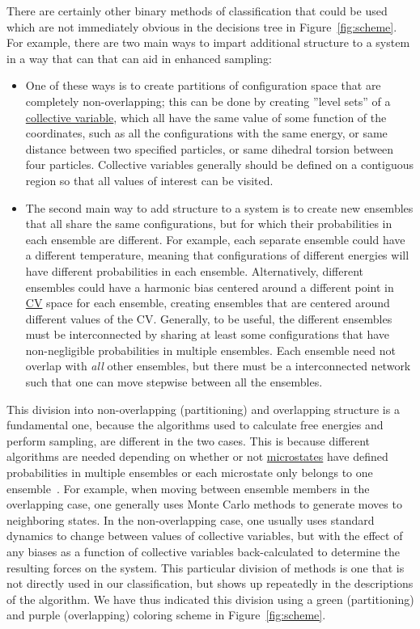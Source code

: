 \documentclass[9pt,review]{livecoms}
\begin{document}
There are certainly other binary methods of classification that could be used which are not immediately obvious in the decisions tree in Figure~\ref{fig:scheme}. For example, there are two main ways to impart additional structure to a system in a way that can that can aid in enhanced sampling:
\begin{itemize}
\item One of these ways is to create partitions of configuration space that are completely non-overlapping; this can be done by creating ''level sets'' of a \hyperlink{ref:CV} {collective variable}, which all have the same value of some function of the coordinates, such as all the configurations with the same energy, or same distance between two specified particles, or same dihedral torsion between four particles. Collective variables generally should be defined on a contiguous region so that all values of interest can be visited.
\item The second main way to add structure to a system is to create new ensembles that all share the same configurations, but for which their probabilities in each ensemble are different. For example, each separate ensemble could have a different temperature, meaning that configurations of different energies will have different probabilities in each ensemble. Alternatively, different ensembles could have a harmonic bias centered around a different point in \hyperlink{ref:CV} {CV} space for each ensemble, creating ensembles that are centered around different values of the CV. Generally, to be useful, the different ensembles must be interconnected by sharing at least some configurations that have non-negligible probabilities in multiple ensembles.  Each ensemble need not overlap with \emph{all} other ensembles, but there must be a interconnected network such that one can move stepwise between all the ensembles.
\end{itemize}
This division into non-overlapping (partitioning) and overlapping structure is a fundamental one, because the algorithms used to calculate free energies and perform sampling, are different in the two cases. This is because different algorithms are needed depending on whether or not \hyperlink{ref:Microstate} {microstates} have defined probabilities in multiple ensembles or each microstate only belongs to one ensemble~\cite{Escobedo_unified_2005,abreu_framework_2006}. For example, when moving between ensemble members in the overlapping case, one generally uses Monte Carlo methods to generate moves to neighboring states. In the non-overlapping case, one usually uses standard dynamics to change between values of collective variables, but with the effect of any biases as a function of collective variables back-calculated to determine the resulting forces on the system. This particular division of methods is one that is not directly used in our classification, but shows up repeatedly in the descriptions of the algorithm. We have thus indicated this division using a green (partitioning) and purple (overlapping) coloring scheme in Figure~\ref{fig:scheme}.
\end{document}
